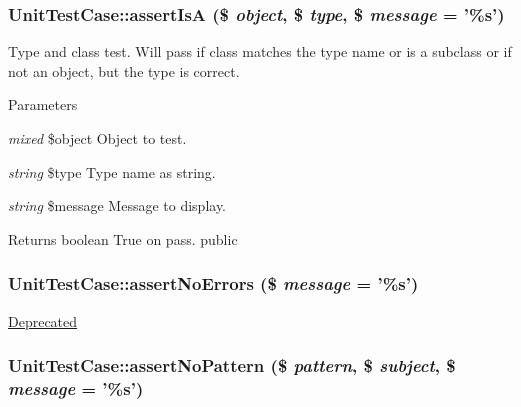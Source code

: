 \hypertarget{class_unit_test_case_acd747d04be9d2e06b526093e4affdab3}{
\subsubsection[{assertIsA}]{\setlength{\rightskip}{0pt plus 5cm}UnitTestCase::assertIsA (\$ {\em object}, \/  \$ {\em type}, \/  \$ {\em message} = {\ttfamily '\%s'})}}
\label{class_unit_test_case_acd747d04be9d2e06b526093e4affdab3}
Type and class test. Will pass if class matches the type name or is a subclass or if not an object, but the type is correct. 
\begin{DoxyParams}{Parameters}
\item[{\em mixed}]\$object Object to test. \item[{\em string}]\$type Type name as string. \item[{\em string}]\$message Message to display. \end{DoxyParams}
\begin{DoxyReturn}{Returns}
boolean True on pass.  public 
\end{DoxyReturn}
\hypertarget{class_unit_test_case_ade3339d36a563bef91ae2e413a94d143}{
\subsubsection[{assertNoErrors}]{\setlength{\rightskip}{0pt plus 5cm}UnitTestCase::assertNoErrors (\$ {\em message} = {\ttfamily '\%s'})}}
\label{class_unit_test_case_ade3339d36a563bef91ae2e413a94d143}
\begin{Desc}
\item[\hyperlink{deprecated__deprecated000021}{Deprecated}]\end{Desc}
\hypertarget{class_unit_test_case_a0260f53af3df61f9a066a172b0848e6e}{
\subsubsection[{assertNoPattern}]{\setlength{\rightskip}{0pt plus 5cm}UnitTestCase::assertNoPattern (\$ {\em pattern}, \/  \$ {\em subject}, \/  \$ {\em message} = {\ttfamily '\%s'})}}
\label{class_unit_test_case_a0260f53af3df61f9a066a172b0848e6e}
